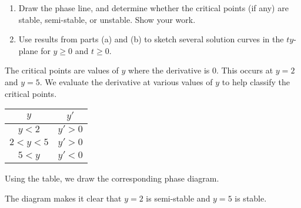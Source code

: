 \documentclass[11pt, titlepage]{article}
\begin{document}
\begin{enumerate}
\begin{enumerate}[label={(\alph*)}]
      \item Draw the phase line, and determine whether the critical points (if any) are stable, semi-stable, or unstable. Show your work.

      \item Use results from parts (a) and (b) to sketch several solution curves in the \(ty\)-plane for \(y \geq 0\) and \(t \geq 0\).
    \end{enumerate}

    \begin{solution}
      The critical points are values of \(y\) where the derivative is 0.
      This occurs at \(y = 2\) and \(y = 5\).
      We evaluate the derivative at various values of \(y\) to help classify the critical points.
      \begin{center}
        \begin{tabular}{|c|c|}
          \hline
          \(y\) & \(y'\) \\
          \hline
          \(y < 2\) & \(y' > 0\) \\
          \hline
          \(2 < y < 5\) & \(y' > 0\) \\
          \hline
          \(5 < y\) & \(y' < 0\) \\
          \hline
        \end{tabular}
      \end{center}
      Using the table, we draw the corresponding phase diagram.
      \begin{figure}[h]
        \centering
      \end{figure}

      The diagram makes it clear that \(y = 2\) is semi-stable and \(y = 5\) is stable.

    \end{solution}

    \pagebreak


\end{enumerate}
\end{document}

